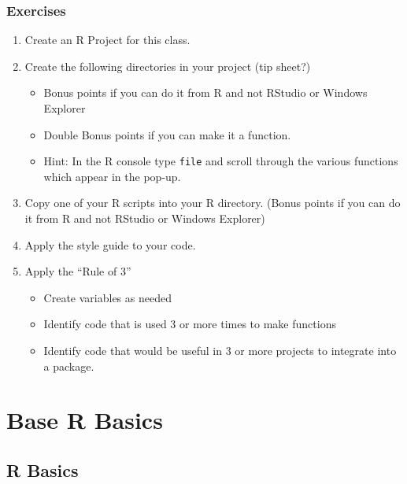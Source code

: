 \documentclass[]{book}
\providecommand{\tightlist}{%
  \setlength{\itemsep}{0pt}\setlength{\parskip}{0pt}}
\theoremstyle{definition}
\theoremstyle{definition}
\theoremstyle{definition}
\theoremstyle{remark}
\begin{document}
\hypertarget{exercises}{%
\section{Exercises}\label{exercises}}

\begin{enumerate}
\def\labelenumi{\arabic{enumi}.}
\tightlist
\item
  Create an R Project for this class.
\item
  Create the following directories in your project (tip sheet?)

  \begin{itemize}
  \tightlist
  \item
    Bonus points if you can do it from R and not RStudio or Windows
    Explorer
  \item
    Double Bonus points if you can make it a function.
  \item
    Hint: In the R console type \texttt{file} and scroll through the
    various functions which appear in the pop-up.
  \end{itemize}
\item
  Copy one of your R scripts into your R directory. (Bonus points if you
  can do it from R and not RStudio or Windows Explorer)
\item
  Apply the style guide to your code.\\
\item
  Apply the ``Rule of 3''

  \begin{itemize}
  \tightlist
  \item
    Create variables as needed
  \item
    Identify code that is used 3 or more times to make functions
  \item
    Identify code that would be useful in 3 or more projects to
    integrate into a package.
  \end{itemize}
\end{enumerate}

\hypertarget{part-base-r-basics}{%
\part{Base R Basics}\label{part-base-r-basics}}

\hypertarget{baser-rbasics}{%
\chapter{R Basics}\label{baser-rbasics}}
\end{document}
